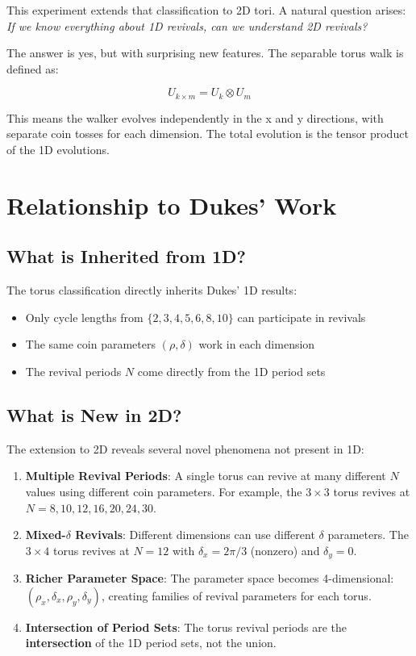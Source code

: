 \documentclass[12pt]{article}
\begin{document}
This experiment extends that classification to 2D tori. A natural question arises: \textit{If we know everything about 1D revivals, can we understand 2D revivals?}

The answer is yes, but with surprising new features. The separable torus walk is defined as:

\[
U_{k \times m} = U_k \otimes U_m
\]

This means the walker evolves independently in the x and y directions, with separate coin tosses for each dimension. The total evolution is the tensor product of the 1D evolutions.

\section{Relationship to Dukes' Work}

\subsection{What is Inherited from 1D?}

The torus classification directly inherits Dukes' 1D results:

\begin{itemize}
    \item Only cycle lengths from \(\{2,3,4,5,6,8,10\}\) can participate in revivals
    \item The same coin parameters \((\rho, \delta)\) work in each dimension
    \item The revival periods \(N\) come directly from the 1D period sets
\end{itemize}

\subsection{What is New in 2D?}

The extension to 2D reveals several novel phenomena not present in 1D:

\begin{enumerate}
    \item \textbf{Multiple Revival Periods}: A single torus can revive at many different \(N\) values using different coin parameters. For example, the \(3 \times 3\) torus revives at \(N = 8, 10, 12, 16, 20, 24, 30\).

    \item \textbf{Mixed-\(\delta\) Revivals}: Different dimensions can use different \(\delta\) parameters. The \(3 \times 4\) torus revives at \(N=12\) with \(\delta_x = 2\pi/3\) (nonzero) and \(\delta_y = 0\).

    \item \textbf{Richer Parameter Space}: The parameter space becomes 4-dimensional: \((\rho_x, \delta_x, \rho_y, \delta_y)\), creating families of revival parameters for each torus.

    \item \textbf{Intersection of Period Sets}: The torus revival periods are the \textbf{intersection} of the 1D period sets, not the union.
\end{enumerate}
\end{document}
